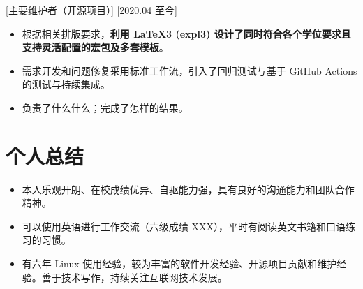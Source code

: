 \documentclass{resume}
\begin{document}
[主要维护者（开源项目）]
[2020.04 至今]

\begin{itemize}
  \item 根据相关排版要求，\textbf{利用 LaTeX3 (expl3) 设计了同时符合各个学位要求且支持灵活配置的宏包及多套模板}。
  \item 需求开发和问题修复采用标准工作流，引入了回归测试与基于 GitHub Actions 的测试与持续集成。
  \item 负责了什么什么；完成了怎样的结果。
\end{itemize}

\section{个人总结}

\begin{itemize}
  \item 本人乐观开朗、在校成绩优异、自驱能力强，具有良好的沟通能力和团队合作精神。
  \item 可以使用英语进行工作交流（六级成绩 XXX），平时有阅读英文书籍和口语练习的习惯。
  \item 有六年 Linux 使用经验，较为丰富的软件开发经验、开源项目贡献和维护经验。善于技术写作，持续关注互联网技术发展。
\end{itemize}
\end{document}

